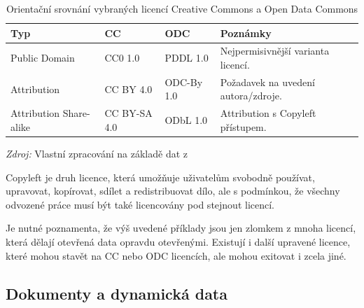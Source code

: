 \begin{table}[!tbp]

\begin{center}
\setlength{\tabcolsep}{3pt}
\renewcommand{\arraystretch}{1.05}
\scriptsize
\caption{Orientační srovnání vybraných licencí Creative Commons a Open Data Commons}\label{tab:prehled-licenci}
\begin{threeparttable}
\begin{tabularx}{\textwidth}{@{}
>{\raggedright\arraybackslash}p{}
  >{\raggedright\arraybackslash}p{}
  >{\raggedright\arraybackslash}p{}
  X@{}}
\toprule
\textbf{Typ} & \textbf{CC} & \textbf{ODC} & \textbf{Poznámky} \\
\midrule
Public Domain & CC0 1.0 & PDDL 1.0 & Nejpermisivnější varianta licencí. \\
Attribution & CC BY 4.0 & ODC-By 1.0 & Požadavek na uvedení autora/zdroje. \\
Attribution Share-alike & CC BY-SA 4.0 & ODbL 1.0 & Attribution s Copyleft\hypertarget{tm:licence-a}{\hyperlink{tn:licence-a}{\tnote{a}}} přístupem.  \\
\bottomrule
\end{tabularx}

\footnotesize \textit{Zdroj:} Vlastní zpracování na základě dat z \parencite{ReusersGuideOpen2013,CCLicenses}

\begin{tablenotes}[flushleft]
  \footnotesize
  \item[a] \hypertarget{tn:licence-a}{} Copyleft je druh licence, která umožňuje uživatelům svobodně používat, upravovat, kopírovat, sdílet a redistribuovat dílo, ale s podmínkou, že všechny odvozené práce musí být také licencovány pod stejnout licencí. \parencite{Copyleft2026}
\end{tablenotes}
\end{threeparttable}
\end{center}

\end{table}
Je nutné poznamenta, že výš uvedené příklady jsou jen zlomkem z mnoha licencí, která dělají otevřená data opravdu otevřenými. Existují i další upravené licence, které mohou stavět na CC nebo ODC licencích, ale mohou exitovat i zcela jiné.

\FloatBarrier
\subsection{Dokumenty a dynamická data}

